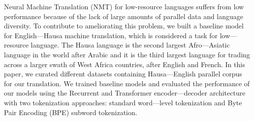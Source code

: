 Neural Machine Translation (NMT) for low-resource languages suffers from low performance because of the lack of large amounts of parallel data and language diversity. To contribute to ameliorating this problem, we built a baseline model for English---Hausa machine translation, which is considered a task for low---resource language. The Hausa language is the second largest Afro---Asiatic language in the world after Arabic and it is the third largest language for trading across a larger swath of West Africa countries, after English and French. In this paper, we curated different datasets containing Hausa---English parallel corpus for our translation. We trained baseline models and evaluated the performance of our models using the Recurrent and Transformer encoder---decoder architecture with two tokenization approaches: standard word---level tokenization and Byte Pair Encoding (BPE) subword tokenization.
